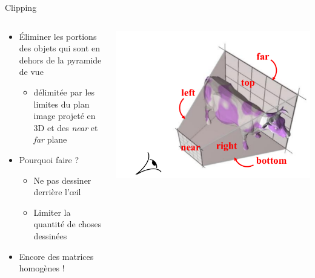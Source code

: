 \begin{frame}{Clipping}
\begin{columns}
\begin{column}{.6\textwidth}
\begin{itemize}
\item Éliminer les portions des objets qui sont en dehors de la pyramide de vue
\begin{itemize}
\item délimitée par les limites du plan image projeté en 3D et des \textit{near} et \textit{far} plane
\end{itemize}
\item Pourquoi faire ?
\begin{itemize}
\item Ne pas dessiner derrière l'\oe il
\item Limiter la quantité de choses dessinées
\end{itemize}
\item Encore des matrices homogènes !
\end{itemize}
\end{column}
\begin{column}{.39\textwidth}
\begin{center}
\includegraphics[height=.4\textheight]{figs/frustum3d.pdf}
\end{center}
\end{column}
\end{columns}
\end{frame}

